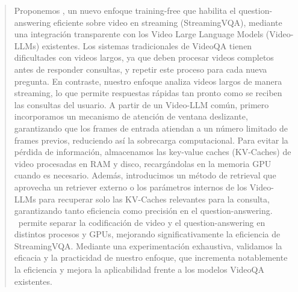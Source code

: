 \begin{abstract}

Proponemos \textbf{\ourmethod}, un nuevo enfoque training-free que habilita el question-answering eficiente sobre video en streaming (StreamingVQA),
mediante una integración transparente con los Video Large Language Models (Video-LLMs) existentes.
Los sistemas tradicionales de VideoQA tienen dificultades con videos largos, ya que deben procesar videos completos antes de responder consultas, y repetir este proceso para cada nueva pregunta. En contraste, nuestro enfoque analiza videos largos de manera streaming, lo que permite respuestas rápidas tan pronto como se reciben las consultas del usuario. A partir de un Video-LLM común, primero incorporamos un mecanismo de atención de ventana deslizante, garantizando que los frames de entrada atiendan a un número limitado de frames previos, reduciendo así la sobrecarga computacional.
Para evitar la pérdida de información, almacenamos las key-value caches (KV-Caches) de video procesadas en RAM y disco, recargándolas en la memoria GPU cuando es necesario. Además, introducimos un método de retrieval que aprovecha un retriever externo o los parámetros internos de los Video-LLMs para recuperar solo las KV-Caches relevantes para la consulta, garantizando tanto eficiencia como precisión en el question-answering. \ourmethod~permite separar la codificación de video y el question-answering en distintos procesos y GPUs, mejorando significativamente la eficiencia de StreamingVQA. Mediante una experimentación exhaustiva, validamos la eficacia y la practicidad de nuestro enfoque, que incrementa notablemente la eficiencia y mejora la aplicabilidad frente a los modelos VideoQA existentes.
    
\end{abstract}
